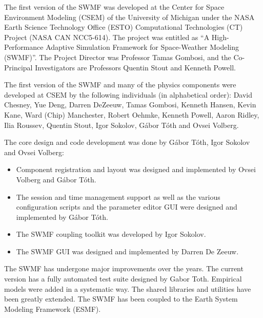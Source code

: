 The first version of the SWMF was developed at the Center for 
Space Environment Modeling (CSEM) of the University of Michigan under 
the NASA Earth Science Technology Office (ESTO) 
Computational Technologies (CT) Project (NASA
CAN NCC5-614). The project was entitled as ``A High-Performance
Adaptive Simulation Framework for Space-Weather Modeling (SWMF)''.
The Project Director was Professor Tamas Gombosi, and the Co-Principal
Investigators are Professors Quentin Stout and Kenneth Powell.

The first version of the SWMF and many of the physics components 
were developed at CSEM by the following individuals (in alphabetical order):
David Chesney, Yue Deng,
Darren DeZeeuw, Tamas Gombosi, Kenneth Hansen, Kevin Kane, Ward (Chip)
Manchester, Robert Oehmke, Kenneth Powell, Aaron Ridley, Ilia Roussev,
Quentin Stout, Igor Sokolov, G\'abor T\'oth and Ovsei Volberg.

The core design and code development was done by G\'abor
T\'oth, Igor Sokolov and Ovsei Volberg:
\begin{itemize}
\item Component registration and layout was designed and implemented by 
      Ovsei Volberg and G\'abor T\'oth.
\item The session and time management support as well as the various
      configuration scripts and the parameter editor GUI were designed and
      implemented by G\'abor T\'oth.
\item The SWMF coupling toolkit was developed by Igor Sokolov.
\item The SWMF GUI was designed and implemented by Darren De Zeeuw.
\end{itemize}
The SWMF has undergone major improvements over the years. 
The current version has a fully automated test suite designed
by Gabor Toth. Empirical models were added in a systematic way.
The shared libraries and utilities have been greatly extended.
The SWMF has been coupled to the Earth System Modeling Framework (ESMF).

